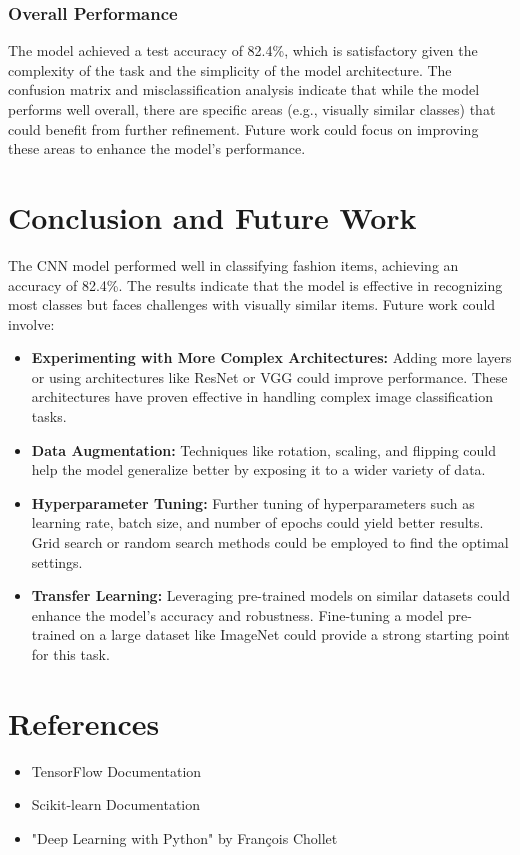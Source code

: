\documentclass[a4paper,10pt]{article}
\begin{document}
\subsubsection{Overall Performance}
The model achieved a test accuracy of 82.4\%, which is satisfactory given the complexity of the task and the simplicity of the model architecture. The confusion matrix and misclassification analysis indicate that while the model performs well overall, there are specific areas (e.g., visually similar classes) that could benefit from further refinement. Future work could focus on improving these areas to enhance the model's performance.

\section{Conclusion and Future Work}
The CNN model performed well in classifying fashion items, achieving an accuracy of 82.4\%. The results indicate that the model is effective in recognizing most classes but faces challenges with visually similar items. Future work could involve:
\begin{itemize}
    \item \textbf{Experimenting with More Complex Architectures:} Adding more layers or using architectures like ResNet or VGG could improve performance. These architectures have proven effective in handling complex image classification tasks.
    \item \textbf{Data Augmentation:} Techniques like rotation, scaling, and flipping could help the model generalize better by exposing it to a wider variety of data.
    \item \textbf{Hyperparameter Tuning:} Further tuning of hyperparameters such as learning rate, batch size, and number of epochs could yield better results. Grid search or random search methods could be employed to find the optimal settings.
    \item \textbf{Transfer Learning:} Leveraging pre-trained models on similar datasets could enhance the model's accuracy and robustness. Fine-tuning a model pre-trained on a large dataset like ImageNet could provide a strong starting point for this task.
\end{itemize}


\section{References}
\begin{itemize}
    \item TensorFlow Documentation
    \item Scikit-learn Documentation
    \item "Deep Learning with Python" by François Chollet
\end{itemize}
\end{document}
